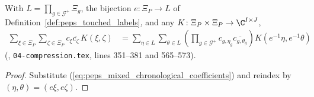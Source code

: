 \begin{lemma}
    \label{thm:peps_mixed_gate_label_sum}
    \leanok
    With $L=\prod_{g\in\mathcal G^+}\Xi_g$, the bijection $e\colon\Xi_P\to L$ of Definition~\ref{def:peps_touched_labels}, and any $K\colon\Xi_P\times\Xi_P\to\C^{I\times J}$,
    \begin{align}
        \sum_{\xi\in\Xi_P}\sum_{\zeta\in\Xi_P}
        c_\xi\overline{c_\zeta}\,K(\xi,\zeta)
         & =\sum_{\eta\in L}\sum_{\theta\in L}
        \left(\prod_{g\in\mathcal G^+}
        c_{g,\eta_g}\overline{c_{g,\theta_g}}\right)
        K(e^{-1}\eta,e^{-1}\theta)
        \label{eq:peps_mixed_gate_label_sum}
    \end{align}
    (\cite[proof of Theorem~5.2]{OpenAI2026PolynomialPEPS}, \texttt{04-compression.tex}, lines 351--381 and 565--573).
\end{lemma}
\begin{proof}\leanok
    Substitute (\ref{eq:peps_mixed_chronological_coefficients}) and reindex by $(\eta,\theta)=(e\xi,e\zeta)$.
\end{proof}
